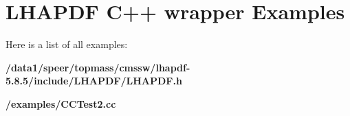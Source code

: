 \section{LHAPDF C++ wrapper Examples}
Here is a list of all examples:\begin{CompactItemize}
\item 
\bf{/data1/speer/topmass/cmssw/lhapdf-5.8.5/include/LHAPDF/LHAPDF.h}
\item 
\bf{/examples/CCTest2.cc}
\end{CompactItemize}
